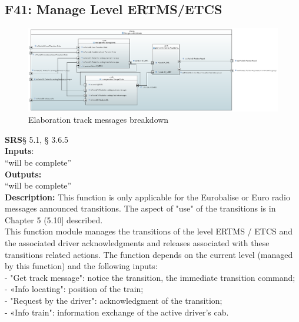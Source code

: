 \documentclass{template/openetcs_report}
\begin{document}
 \subsection {F41: Manage Level ERTMS/ETCS}
 
 \begin{figure}[hbtp]
\centering
\includegraphics [scale=0.4] {images/Manage_Level_and_Modes}
\caption{Elaboration track messages breakdown}
\end{figure}
 
 \textbf{SRS}§ 5.1, § 3.6.5 \\
 
 \textbf{Inputs}:\\
``will be complete''\\
 
 \textbf{Outputs:}\\
 ``will be complete''\\
 
 \textbf{Description:} 
This function is only applicable for the Eurobalise or Euro radio messages 
announced transitions. The aspect of "use" of the transitions is in Chapter 5 (5.10]
described. \\

This function module manages the transitions of the level ERTMS / ETCS and the 
associated driver acknowledgments and releases associated with these transitions 
related actions. 
The function depends on the current level (managed by this function) and the 
following inputs: \\

- "Get track message": notice the transition, the immediate transition command; \\

- «Info locating": position of the train; \\

- "Request by the driver": acknowledgment of the transition; \\

- «Info train": information exchange of the active driver's cab.\\
\end{document}
